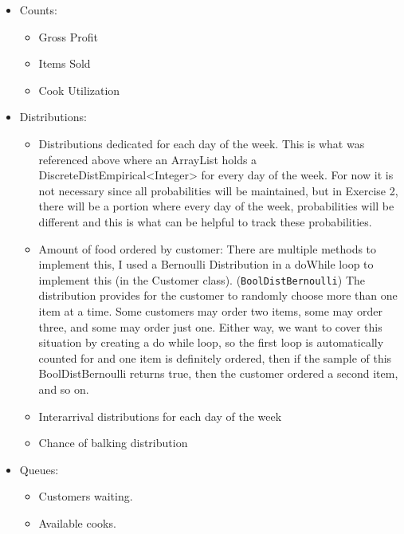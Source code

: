 \documentclass[11pt]{article}
\newcommand{\class}[1]{\texttt{#1}}
\begin{document}
\begin{itemize} [noitemsep]
	\item Counts:
	\begin{itemize} [noitemsep]
		\item Gross Profit
		\item Items Sold
		\item Cook Utilization
	\end{itemize}
	\item Distributions:
	\begin{itemize} [noitemsep]
		\item Distributions dedicated for each day of the week. This is what was referenced above where an ArrayList holds a DiscreteDistEmpirical<Integer> for every day of the week. For now it is not necessary since all probabilities will be maintained, but in Exercise 2, there will be a portion where every day of the week, probabilities will be different and this is what can be helpful to track these probabilities.
		\item Amount of food ordered by customer: There are multiple methods to implement this, I used a Bernoulli Distribution in a doWhile loop to implement this (in the Customer class). (\class{BoolDistBernoulli}) The distribution provides for the customer to randomly choose more than one item at a time. Some customers may order two items, some may order three, and some may order just one. Either way, we want to cover this situation by creating a do while loop, so the first loop is automatically counted for and one item is definitely ordered, then if the sample of this BoolDistBernoulli returns true, then the customer ordered a second item, and so on.
		\item Interarrival distributions for each day of the week
		\item Chance of balking distribution
	\end{itemize}
	\item Queues:
	\begin{itemize} [noitemsep]
		\item Customers waiting.
		\item Available cooks.
	\end{itemize}
\end{itemize}
\end{document}
